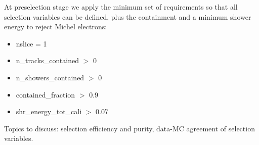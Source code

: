 \documentclass[a4paper]{article}
\begin{document}
At preselection stage we apply the minimum set of requirements so that all selection variables can be defined, plus the containment and a minimum shower energy to reject Michel electrons:
\begin{itemize}
    \item nslice = 1
    \item n\_tracks\_contained $>$ 0
    \item n\_showers\_contained $>$ 0
    \item contained\_fraction $>$ 0.9
    \item shr\_energy\_tot\_cali $>$ 0.07
\end{itemize}

\par 
Topics to discuss: selection efficiency and purity, data-MC agreement of selection variables.
\end{document}
